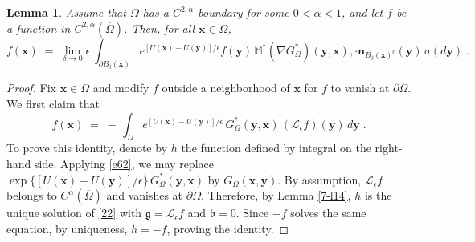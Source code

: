 \documentclass[reqno]{amsart}
\newtheorem{lemma}[theorem]{Lemma}
\newcounter{as}[section]
\newcommand{\mc}[1]{{\mathcal #1}}
\newcommand{\mf}[1]{{\mathfrak #1}}
\newcommand{\bb}[1]{{\mathbb #1}}
\newcommand{\bs}[1]{{\boldsymbol #1}}
\newcommand{\<}{\langle}
\renewcommand{\>}{\rangle}
\begin{document}
\begin{lemma}
\label{7-l13}
Assume that $\Omega$ has a $C^{2,\alpha}$-boundary for some
$0<\alpha<1$, and let $f$ be a function in
$C^{2,\alpha}(\overline{\Omega})$. Then, for all $\bs x\in \Omega$,
\begin{equation*}
f(\bs x) \;=\; \lim_{\delta\to 0} \epsilon\, \int_{\partial B_\delta(\bs x)}
e^{[U(\bs x) - U(\bs y)]/\epsilon} f(\bs y)\, \bb M^\dagger (\nabla G_\Omega^*)(\bs
y,\bs{x}), \cdot \bs n_{B_\delta(\bs x)^c} (\bs{y})\, \sigma(d\bs y)\;.
\end{equation*}
\end{lemma}

\begin{proof}
Fix $\bs x\in \Omega$ and modify $f$ outside a neighborhood of $\bs x$
for $f$ to vanish at $\partial \Omega$. We first claim that
\begin{equation*}
f(\bs x) \;=\; -\, \int_{\Omega} e^{[U(\bs x) - U(\bs y)]/\epsilon}
\, G_\Omega^*(\bs y, \bs x) \, (\mc L_\epsilon f) (\bs y)\, d\bs y\;.
\end{equation*}
To prove this identity, denote by $h$ the function defined by integral
on the right-hand side.  Applying \eqref{e62}, we may replace $\exp\{
[U(\bs x) - U(\bs y)]/\epsilon\} \, G_\Omega^*(\bs y, \bs x)$ by $G_\Omega(\bs x,
\bs y)$. By assumption, $\mc L_\epsilon f$ belongs to
$C^\alpha(\overline{\Omega})$ and vanishes at $\partial
\Omega$. Therefore, by Lemma \ref{7-l14}, $h$ is the unique solution
of \eqref{22} with $\mf g = \mc L_\epsilon f$ and $\mf b=0$. Since
$-f$ solves the same equation, by uniqueness, $h=-f$, proving the
identity.


\end{proof}
\end{document}
